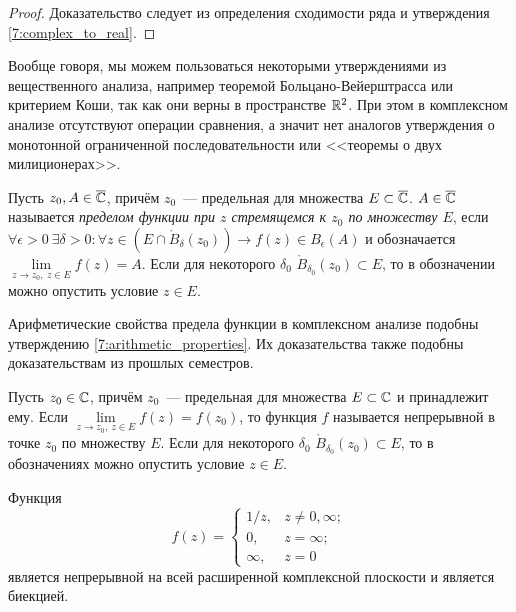 \begin{proof}
Доказательство следует из определения сходимости ряда и утверждения \ref{7:complex_to_real}.
\end{proof}

Вообще говоря, мы можем пользоваться некоторыми утверждениями из вещественного анализа, например
теоремой Больцано-Вейерштрасса или критерием Коши, так как они верны в пространстве \(\mathbb{R}^2\). При
этом в комплексном анализе отсутствуют операции сравнения, а значит нет аналогов утверждения о
монотонной ограниченной последовательности или <<теоремы о двух милиционерах>>.



\begin{definition}
Пусть \(z_0, A \in \overline{\mathbb{C}}\), причём \(z_0\)~--- предельная для множества \(E \subset \overline{\mathbb{C}}\). \(A \in
\overline{\mathbb{C}}\) называется \textit{пределом функции при \(z\) стремящемся к \(z_0\) по множеству \(E\)}, если
\(\forall \epsilon > 0 \ \exists \delta > 0 \colon \forall z \in (E \cap \mathring{B}_\delta (z_0))
\rightarrow f(z) \in B_\epsilon(A)\) и обозначается \(\lim\limits_{z \to z_0, \ z \in E} f(z) = A\).
Если для некоторого \(\delta_0\) \(\mathring{B}_{\delta_0} (z_0) \subset E\), то в обозначении можно
опустить условие \(z \in E\).
\end{definition}

\begin{note}
Арифметические свойства предела функции в комплексном анализе подобны утверждению
\ref{7:arithmetic_properties}. Их доказательства также подобны доказательствам из прошлых семестров.
\end{note}

\begin{definition}
Пусть \(z_0 \in \mathbb{C}\), причём \(z_0\)~--- предельная для множества \(E \subset \mathbb{C}\) и принадлежит
ему. Если \(\lim\limits_{z \to z_0, \ z \in E} f(z) = f(z_0)\), то функция \(f\) называется
непрерывной в точке \(z_0\) по множеству \(E\). Если для некоторого \(\delta_0\)
\(\mathring{B}_{\delta_0} (z_0) \subset E\), то в обозначениях можно опустить условие \(z \in E\).
\end{definition}

\begin{example}
Функция
\begin{equation*}
    f(z) =
        \begin{cases}
            1/z, & z \neq 0, \infty; \\
            0, & z = \infty; \\
            \infty, & z = 0
        \end{cases}
\end{equation*}
является непрерывной на всей расширенной комплексной плоскости и является биекцией.
\end{example}

